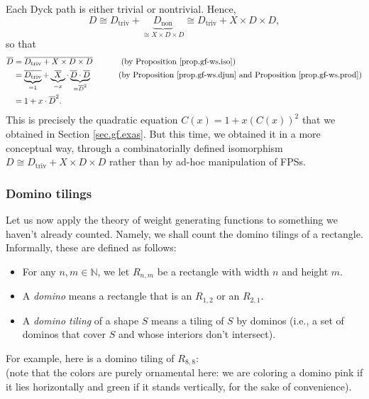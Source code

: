 \begin{itemize}
Each Dyck path is either trivial or nontrivial. Hence,%
\[
D\cong D_{\operatorname*{triv}}+\underbrace{D_{\operatorname*{non}}}_{\cong
X\times D\times D}\cong D_{\operatorname*{triv}}+X\times D\times D,
\]
so that%
\begin{align*}
\overline{D} &  =\overline{D_{\operatorname*{triv}}+X\times D\times
D}\ \ \ \ \ \ \ \ \ \ \left(  \text{by Proposition \ref{prop.gf-ws.iso}%
}\right)  \\
&  =\underbrace{\overline{D_{\operatorname*{triv}}}}_{=1}%
+\underbrace{\overline{X}}_{=x}\cdot\underbrace{\overline{D}\cdot\overline{D}%
}_{=\overline{D}^{2}}\ \ \ \ \ \ \ \ \ \ \left(  \text{by Proposition
\ref{prop.gf-ws.djun} and Proposition \ref{prop.gf-ws.prod}}\right)  \\
&  =1+x\cdot\overline{D}^{2}.
\end{align*}
This is precisely the quadratic equation $C\left(  x\right)  =1+x\left(
C\left(  x\right)  \right)  ^{2}$ that we obtained in Section
\ref{sec.gf.exas}. But this time, we obtained it in a more conceptual way,
through a combinatorially defined isomorphism $D\cong D_{\operatorname*{triv}%
}+X\times D\times D$ rather than by ad-hoc manipulation of FPSs.
\end{itemize}

\subsubsection{\label{subsec.gf.weighted-set.domino}Domino tilings}

Let us now apply the theory of weight generating functions to something we
haven't already counted. Namely, we shall count the domino tilings of a
rectangle. Informally, these are defined as follows:

\begin{itemize}
\item For any $n,m\in\mathbb{N}$, we let $R_{n,m}$ be a rectangle with width
$n$ and height $m$.

\item A \emph{domino} means a rectangle that is an $R_{1,2}$ or an $R_{2,1}$.

\item A \emph{domino tiling} of a shape $S$ means a tiling of $S$ by dominos
(i.e., a set of dominos that cover $S$ and whose interiors don't intersect).
\end{itemize}

For example, here is a domino tiling of $R_{8,8}$:%
\[%
\]
(note that the colors are purely ornamental here: we are coloring a domino
pink if it lies horizontally and green if it stands vertically, for the sake
of convenience).

